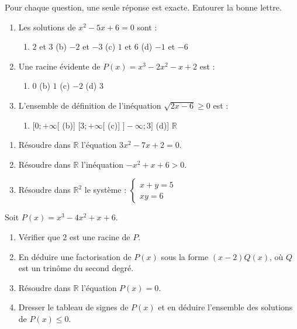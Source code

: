 \documentclass[11pt]{article}
\begin{document}
\begin{exercice}[QCM]
Pour chaque question, une seule réponse est exacte. Entourer la bonne lettre.
\begin{enumerate}
  \item Les solutions de $x^2-5x+6=0$ sont :
  \begin{enumerate}
    \item[(a)] $2$ et $3$ \quad (b) $-2$ et $-3$ \quad (c) $1$ et $6$ \quad (d) $-1$ et $-6$
  \end{enumerate}
  \item Une racine évidente de $P(x)=x^3-2x^2-x+2$ est :
  \begin{enumerate}
    \item[(a)] $0$ \quad (b) $1$ \quad (c) $-2$ \quad (d) $3$
  \end{enumerate}
  \item L'ensemble de définition de l'inéquation $\sqrt{2x-6}\geq 0$ est :
  \begin{enumerate}
    \item[(a)] $[0;+\infty[$ \quad (b)] $[3;+\infty[$ \quad (c)] $]-\infty;3]$ \quad (d)] $\mathbb{R}$
  \end{enumerate}
\end{enumerate}
\end{exercice}

\begin{exercice}
\begin{enumerate}
  \item Résoudre dans $\mathbb{R}$ l'équation $3x^2-7x+2=0$.
  \item Résoudre dans $\mathbb{R}$ l'inéquation $-x^2+x+6>0$.
  \item Résoudre dans $\mathbb{R}^2$ le système : $\begin{cases} x+y=5 \\ xy=6 \end{cases}$
\end{enumerate}
\end{exercice}

\begin{exercice}
Soit $P(x)=x^3-4x^2+x+6$.
\begin{enumerate}
  \item Vérifier que $2$ est une racine de $P$.
  \item En déduire une factorisation de $P(x)$ sous la forme $(x-2)Q(x)$, où $Q$ est un trinôme du second degré.
  \item Résoudre dans $\mathbb{R}$ l'équation $P(x)=0$.
  \item Dresser le tableau de signes de $P(x)$ et en déduire l'ensemble des solutions de $P(x)\leq 0$.
\end{enumerate}
\end{exercice}
\end{document}
